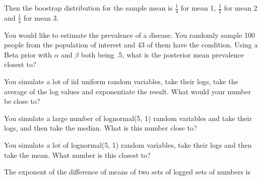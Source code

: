 \documentclass{homework}
\begin{document}
Then the boostrap distribution for the sample mean is $\frac{1}{4}$ for mean 1, $\frac{1}{2}$ for mean 2 and $\frac{1}{4}$ for mean 3.



\begin{tcolorbox}[title=Question 1]
You would like to estimate the prevalence of a disease. You randomly sample 100 people from the population of interest and 43 of them have the condition. Using a Beta prior with $\alpha$ and $\beta$ both being .5, what is the posterior mean prevalence closest to?
\end{tcolorbox}

\begin{tcolorbox}[title=Question 2]
You simulate a lot of iid uniform random variables, take their logs, take the average of the log values and exponentiate the result. What would your number be close to?
\end{tcolorbox}

\begin{tcolorbox}[title=Question 3]
You simulate a large number of lognormal(5, 1) random variables and take their logs, and then take the median. What is this number close to?
\end{tcolorbox}

\begin{tcolorbox}[title=Question 4]
You simulate a lot of lognormal(5, 1) random variables, take their logs and then take the mean. What number is this closest to?
\end{tcolorbox}

\begin{tcolorbox}[title=Question 5]
The exponent of the difference of means of two sets of logged sets of numbers is
\end{tcolorbox}
\end{document}
